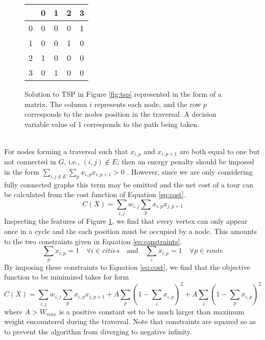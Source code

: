 	\begin{figure}[h]
		\begin{center}
				\begin{tabular}{c|cccc}
				\backslashbox{i}{p}&0 &1 &2 &3 \\
				\hline
				0& 0&0&0&1\\
				
				1& 0&0&1&0\\
				
				2& 1&0&0&0\\
				
				3& 0&1&0&0\\
			\end{tabular}
		\end{center}\caption{Solution to TSP in Figure \ref{fig:tsp} represented in the form of a matrix. The column $i$ represents each node, and the row $p$ corresponds to the nodes position in the traversal. A decision variable value of 1 corresponds to the path being taken.}\label{fig:matrix}
	\end{figure}\\
	For nodes forming a traversal such that $x_{i,p}$ and $x_{i,p+1}$ are both equal to one but not connected in $G$, i.e., $(i,j)\notin E$, then an energy penalty should be imposed in the form $\sum_{i,j \notin E}\sum_p x_{i,p}x_{i,p+1}>0$ \cite{lucas2014ising}.
	However, since we are only considering fully connected graphs this term may be omitted and the net cost of a tour can be calculated from the cost function of Equation \ref{eq:cost}.
	\begin{equation}
		C(X)=\sum_{i,j}w_{i,j} \sum_p x_{i,p}x_{j,p+1} 
		\label{eq:cost}
	\end{equation}
	Inspecting the features of Figure \ref{fig:matrix}, we find that every vertex can only appear once in a cycle and the each position must be occupied by a node. 
	This amounts to the two constraints given in Equation \ref{eq:constraints}.
	\begin{equation}
		\sum_p x_{i,p}=1 \quad \forall i \in cities \quad \text{and} \quad \sum_i x_{i,p}=1 \quad \forall p \in route
		\label{eq:constraints}
	\end{equation}
	By imposing these constraints to Equation \ref{eq:cost}, we find that the objective function to be minimized takes for form
	\begin{equation}
		C(X)=\sum_{i,j}w_{i,j} \sum_p x_{i,p}x_{j,p+1} + A\sum_p (1 - \sum_i x_{i,p})^2 + A\sum_i (1 - \sum_p x_{i,p})^2
		\label{eq:hamiltoniancircuit}
	\end{equation}
	where $A>W_{max}$ is a positive constant set to be much larger than maximum weight encountered during the traversal. Note that constraints are squared so as to prevent the algorithm from diverging to negative infinity. \\
	

